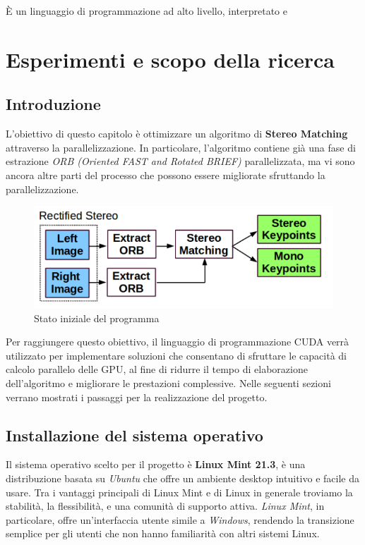 \documentclass[12pt,a4paper]{report}
\begin{document}
È un linguaggio di programmazione ad alto livello, interpretato e

\chapter{Esperimenti e scopo della ricerca}

\section{Introduzione}

L'obiettivo di questo capitolo è ottimizzare un algoritmo di \textbf{Stereo Matching} attraverso la parallelizzazione. In particolare, l'algoritmo contiene già una fase di estrazione \textit{ORB (Oriented FAST and Rotated BRIEF)} parallelizzata, ma vi sono ancora altre parti del processo che possono essere migliorate sfruttando la parallelizzazione.

\begin{figure}[h]
    \centering
    \includegraphics[width=0.7\linewidth]{img/start_point_opt.png}
    \caption{Stato iniziale del programma \cite{ORB_SLAM_2}}
\end{figure}


Per raggiungere questo obiettivo, il linguaggio di programmazione CUDA verrà utilizzato per implementare soluzioni che consentano di sfruttare le capacità di calcolo parallelo delle GPU, al fine di ridurre il tempo di elaborazione dell'algoritmo e migliorare le prestazioni complessive.
Nelle seguenti sezioni verrano mostrati i passaggi per la realizzazione del progetto.


\section{Installazione del sistema operativo}

Il sistema operativo scelto per il progetto è \textbf{Linux Mint 21.3}, è una distribuzione basata su \textit{Ubuntu} che offre un ambiente desktop intuitivo e facile da usare. Tra i vantaggi principali di Linux Mint e di Linux in generale troviamo la stabilità, la flessibilità, e una comunità di supporto attiva. \textit{Linux Mint}, in particolare, offre un'interfaccia utente simile a \textit{Windows}, rendendo la transizione semplice per gli utenti che non hanno familiarità con altri sistemi Linux.
\end{document}
